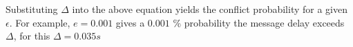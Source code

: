 \documentclass[sigplan,10pt]{acmart}
\begin{document}
Substituting $\Delta$ into the above equation yields the conflict probability for a given $\epsilon$. For example, $ e = 0.001$ gives a $0.001$ \% probability the message delay exceeds $\Delta$, for this  $\Delta = 0.035s$












\end{document}
